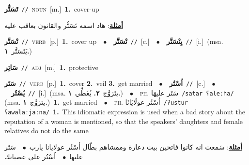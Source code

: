 \documentclass[10pt,a4paper,twoside]{article} %
\begin{document}
\begin{multicols}{2}
{\setlength\topsep{0pt}\textbf{\foreignlanguage{arabic}{تَسَتُّر}}\ {\color{gray}\texttt{//}\color{black}}\ \textsc{noun}\ [m.]\ \textbf{1.}~cover-up\  \begin{flushright}\color{gray}\foreignlanguage{arabic}{\textbf{\underline{\foreignlanguage{arabic}{أمثلة}}}: هاد اسمه تَسَتُّر والقانون بعاقب عليه}\end{flushright}\color{black}} \vspace{2mm}

{\setlength\topsep{0pt}\textbf{\foreignlanguage{arabic}{تْسَتَّر}}\ {\color{gray}\texttt{//}\color{black}}\ \textsc{verb}\ [p.]\ \textbf{1.}~cover up\ \ $\bullet$\ \ \setlength\topsep{0pt}\textbf{\foreignlanguage{arabic}{تْسَتَّر}}\ {\color{gray}\texttt{//}\color{black}}\ [c.]\ \ $\bullet$\ \ \setlength\topsep{0pt}\textbf{\foreignlanguage{arabic}{يِتْسَتَّر}}\ {\color{gray}\texttt{//}\color{black}}\ [i.]\ \color{gray}(msa. \foreignlanguage{arabic}{يَتَسَتَّر}~\foreignlanguage{arabic}{\textbf{١.}})\color{black}\ } \vspace{2mm}

{\setlength\topsep{0pt}\textbf{\foreignlanguage{arabic}{سَاتِر}}\ {\color{gray}\texttt{//}\color{black}}\ \textsc{adj}\ [m.]\ \textbf{1.}~protective\ } \vspace{2mm}

{\setlength\topsep{0pt}\textbf{\foreignlanguage{arabic}{سَتَر}}\ {\color{gray}\texttt{//}\color{black}}\ \textsc{verb}\ [p.]\ \textbf{1.}~cover  \textbf{2.}~veil  \textbf{3.}~get married\ \ $\bullet$\ \ \setlength\topsep{0pt}\textbf{\foreignlanguage{arabic}{اُسْتُر}}\ {\color{gray}\texttt{//}\color{black}}\ [c.]\ \ $\bullet$\ \ \setlength\topsep{0pt}\textbf{\foreignlanguage{arabic}{يُسْتُر}}\ {\color{gray}\texttt{//}\color{black}}\ [i.]\ \color{gray}(msa. \foreignlanguage{arabic}{يتَزوَّج}~\foreignlanguage{arabic}{\textbf{٢.}}  \foreignlanguage{arabic}{يُغَطِّي}~\foreignlanguage{arabic}{\textbf{١.}})\color{black}\ \ $\bullet$\ \ \textsc{ph.} \color{gray} \foreignlanguage{arabic}{سَتَر عليهَا}\color{black}\ {\color{gray}\texttt{/{\sffamily satar ʕaleːha}/}\color{black}}\ \color{gray} (msa. \foreignlanguage{arabic}{يتزوَّج}~\foreignlanguage{arabic}{\textbf{١.}})\color{black}\ \textbf{1.}~get married\ \ $\bullet$\ \ \textsc{ph.} \color{gray} \foreignlanguage{arabic}{اُسْتُر عولَايَانَا}\color{black}\ {\color{gray}\texttt{/{\sffamily ʔustur ʕawalaːjaːna}/}\color{black}}\ \textbf{1.}~This idiomatic expression is used when a bad story about the reputation of a woman is mentioned, so that the speakers' daughters and female relatives do not do the same\  \begin{flushright}\color{gray}\foreignlanguage{arabic}{\textbf{\underline{\foreignlanguage{arabic}{أمثلة}}}: سَمعت انه كانوا فاتحين بيت دعارة وممشاهم بطّال اُسْتُر عولايانا يارب\ $\bullet$\ \  سَتَر عليها\ $\bullet$\ \  اُسْتُر على عصبانك}\end{flushright}\color{black}} \vspace{2mm}


\end{multicols}
\end{document}
